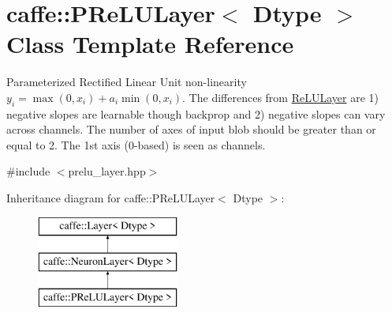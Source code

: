\hypertarget{classcaffe_1_1PReLULayer}{}\section{caffe\+:\+:P\+Re\+L\+U\+Layer$<$ Dtype $>$ Class Template Reference}
\label{classcaffe_1_1PReLULayer}


Parameterized Rectified Linear Unit non-\/linearity $ y_i = \max(0, x_i) + a_i \min(0, x_i) $. The differences from \hyperlink{classcaffe_1_1ReLULayer}{Re\+L\+U\+Layer} are 1) negative slopes are learnable though backprop and 2) negative slopes can vary across channels. The number of axes of input blob should be greater than or equal to 2. The 1st axis (0-\/based) is seen as channels.  




{\ttfamily \#include $<$prelu\+\_\+layer.\+hpp$>$}

Inheritance diagram for caffe\+:\+:P\+Re\+L\+U\+Layer$<$ Dtype $>$\+:\begin{figure}[H]
\begin{center}
\leavevmode
\includegraphics[height=3.000000cm]{classcaffe_1_1PReLULayer}
\end{center}
\end{figure}
